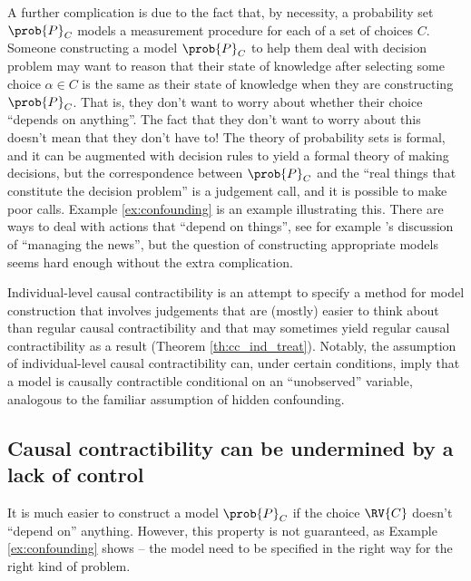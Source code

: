 A further complication is due to the fact that, by necessity, a probability set $\prob{P}_C$ models a measurement procedure for each of a set of choices $C$. Someone constructing a model $\prob{P}_C$ to help them deal with decision problem may want to reason that their state of knowledge after selecting some choice $\alpha\in C$ is the same as their state of knowledge when they are constructing $\prob{P}_C$. That is, they don't want to worry about whether their choice ``depends on anything''. The fact that they don't want to worry about this doesn't mean that they don't have to! The theory of probability sets is formal, and it can be augmented with decision rules to yield a formal theory of making decisions, but the correspondence between $\prob{P}_C$ and the ``real things that constitute the decision problem'' is a judgement call, and it is possible to make poor calls. Example \ref{ex:confounding} is an example illustrating this. There are ways to deal with actions that ``depend on things'', see for example \citet{gallow_causal_2020}'s discussion of ``managing the news'', but the question of constructing appropriate models seems hard enough without the extra complication.

Individual-level causal contractibility is an attempt to specify a method for model construction that involves judgements that are (mostly) easier to think about than regular causal contractibility and that may sometimes yield regular causal contractibility as a result (Theorem \ref{th:cc_ind_treat}). Notably, the assumption of individual-level causal contractibility can, under certain conditions, imply that a model is causally contractible conditional on an ``unobserved'' variable, analogous to the familiar assumption of hidden confounding. 

\subsection{Causal contractibility can be undermined by a lack of control}\label{sec:assessing}

It is much easier to construct a model $\prob{P}_C$ if the choice $\RV{C}$ doesn't ``depend on'' anything. However, this property is not guaranteed, as Example \ref{ex:confounding} shows -- the model need to be specified in the right way for the right kind of problem. 

